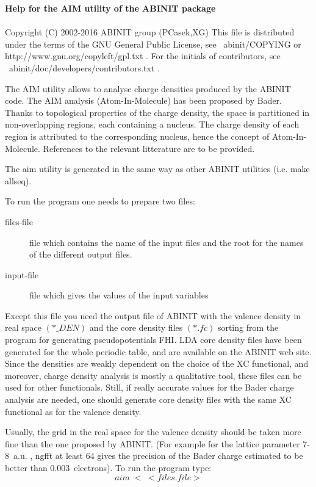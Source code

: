\documentclass[11pt]{article}
\begin{document}
{\Huge \bf Help for the AIM utility of the ABINIT package} \\ \\

     Copyright (C) 2002-2016 ABINIT group (PCasek,XG)
     This file is distributed under the terms of the
     GNU General Public License, see ~abinit/COPYING
     or http://www.gnu.org/copyleft/gpl.txt .
     For the initials of contributors, see ~abinit/doc/developers/contributors.txt .

The AIM utility allows to analyse charge densities
produced by the ABINIT code. The AIM analysis (Atom-In-Molecule)
has been proposed by Bader. Thanks to topological
properties of the charge density, the space is partitioned
in non-overlapping regions, each containing a nucleus.
The charge density of each region is attributed to the
corresponding nucleus, hence the concept of Atom-In-Molecule.
References to the relevant litterature are to be provided.

The aim utility is generated in the same way as other
ABINIT utilities (i.e. make allseq).

To run the program one needs to prepare two files:
\begin{description}
\item [files-file] file which contains the name of the input files and the
root for the names of the different output files.
\item [input-file] file which gives the values of the input variables
\end{description}
Except this file you need the output file of ABINIT with the valence
density in real space $(*\_DEN)$ and the core density files $(*.fc)$ sorting
from the program for generating pseudopotentials FHI.
LDA core density files have been generated for the
whole periodic table, and are available on the ABINIT web site.
Since the densities are weakly dependent on the choice of the
XC functional, and moreover, charge density analysis
is mostly a qualitative tool, these files can be used
for other functionals. Still, if really accurate
values for the Bader charge analysis are needed, one should
generate core density files with the same XC functional as
for the valence density.

Usually, the grid in the real space for the valence density should be
taken more fine than the one proposed by ABINIT.
(For example for the lattice parameter 7-8~a.u. , ngfft at least 64
gives the precision of the Bader charge estimated to be better
than 0.003~electrons).
To run the program type: $$aim\; < \; <files.file> $$
\end{document}
